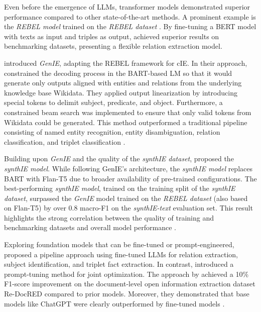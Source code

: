 \documentclass[a4paper,oneside,bibliography=totoc]{scrbook}
\begin{document}
Even before the emergence of \acp{LLM}, transformer models demonstrated superior performance compared to other state-of-the-art methods. A prominent example is the \textit{REBEL model} trained on the \textit{REBEL dataset} \cite{HuguetCabot2021}. By fine-tuning a BERT model with texts as input and triples as output, \citet{HuguetCabot2021} achieved superior results on benchmarking datasets, presenting a flexible relation extraction model.

\citet{Josifoski2021} introduced \textit{GenIE}, adapting the REBEL framework for \ac{cIE}. In their approach, \citet{Josifoski2021} constrained the decoding process in the BART-based \ac{LM} so that it would generate only outputs aligned with entities and relations from the underlying knowledge base Wikidata. They applied output linearization by introducing special tokens to delimit subject, predicate, and object. Furthermore, a constrained beam search was implemented to ensure that only valid tokens from Wikidata could be generated. This method outperformed a traditional pipeline consisting of named entity recognition, entity disambiguation, relation classification, and triplet classification \cite{Josifoski2021}.

Building upon \textit{GenIE} and the quality of the \textit{synthIE dataset}, \citet{Josifoski2023} proposed the \textit{synthIE model}. While following GenIE’s architecture, the \textit{synthIE model} replaces BART with Flan-T5 due to broader availability of pre-trained configurations. The best-performing \textit{synthIE model}, trained on the training split of the \textit{synthIE dataset}, surpassed the \textit{GenIE} model trained on the \textit{REBEL dataset} (also based on Flan-T5) by over 0.8 macro-F1 on the \textit{synthIE-text} evaluation set. This result highlights the strong correlation between the quality of training and benchmarking datasets and overall model performance \cite{Josifoski2023}.

Exploring foundation models that can be fine-tuned or prompt-engineered, \citet{Xue2024} proposed a pipeline approach using fine-tuned \acp{LLM} for relation extraction, subject identification, and triplet fact extraction. In contrast, \citet{Chen2024} introduced a prompt-tuning method for joint optimization. The approach by \citet{Xue2024} achieved a 10\% F1-score improvement on the document-level open information extraction dataset Re-DocRED compared to prior models. Moreover, they demonstrated that base models like ChatGPT were clearly outperformed by fine-tuned models \cite{Xue2024}.
\end{document}
